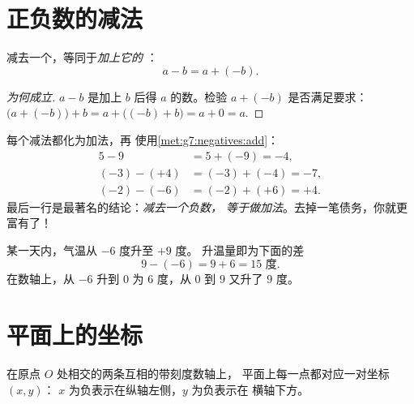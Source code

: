 \section{正负数的减法}

\begin{theorem}[减法法则]\label{thm:g7:negatives:sub}
减去一个，等同于\emph{加上它的
}：
\[
a - b = a + (-b) .
\]
\end{theorem}

\begin{proof}[为何成立]
$a - b$ 是加上 $b$ 后得 $a$ 的数。检验
$a + (-b)$ 是否满足要求：
$\bigl(a + (-b)\bigr) + b = a + \bigl((-b) + b\bigr) = a + 0 = a$.
\end{proof}

\begin{example}\label{ex:g7:negatives:sub}
每个减法都化为加法，再
使用\cref{met:g7:negatives:add}：
\begin{align*}
5 - 9 &= 5 + (-9) = -4, \\
(-3) - (+4) &= (-3) + (-4) = -7, \\
(-2) - (-6) &= (-2) + (+6) = +4 .
\end{align*}
最后一行是最著名的结论：\emph{减去一个负数，
等于做加法}。去掉一笔债务，你就更富有了！
\end{example}

\begin{example}[温差]\label{ex:g7:negatives:temperature}
某一天内，气温从 $-6$ 度升至 $+9$ 度。
升温量即为下面的差
\[
9 - (-6) = 9 + 6 = 15 \text{ 度}.
\]
在数轴上，从 $-6$ 升到 $0$ 为 $6$ 度，从 $0$ 到
$9$ 又升了 $9$ 度。
\end{example}

\section{平面上的坐标}

\begin{definition}[带符号的坐标]\label{def:g7:negatives:coords}
在原点 $O$ 处相交的两条互相的带刻度数轴上，
平面上每一点都对应一对坐标 $(x, y)$：
$x$ 为负表示在纵轴左侧，$y$ 为负表示在
横轴下方。
\end{definition}

